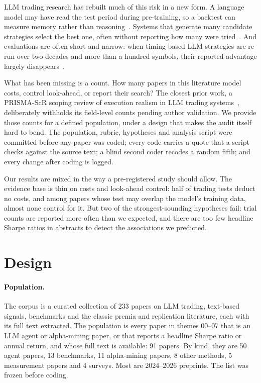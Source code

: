 \documentclass[11pt]{article}
\begin{document}
LLM trading research has rebuilt much of this risk in a new form. A language
model may have read the test period during pre-training, so a backtest can
measure memory rather than reasoning~\cite{li2025timetravel,li2025mirage,gao2026lookahead}.
Systems that generate many candidate strategies select the best one, often
without reporting how many were tried~\cite{gencay2026honest}. And evaluations
are often short and narrow: when timing-based LLM strategies are re-run over two
decades and more than a hundred symbols, their reported advantage largely
disappears~\cite{li2026finsaber}.

What has been missing is a count. How many papers in this literature model
costs, control look-ahead, or report their search? The closest prior work, a
PRISMA-ScR scoping review of execution realism in LLM trading
systems~\cite{yao2026execution}, deliberately withholds its field-level counts
pending author validation. We provide those counts for a defined population,
under a design that makes the audit itself hard to bend. The population,
rubric, hypotheses and analysis script were committed before any paper was
coded; every code carries a quote that a script checks against the source text;
a blind second coder recodes a random fifth; and every change after coding is
logged.

Our results are mixed in the way a pre-registered study should allow. The
evidence base is thin on costs and look-ahead control: half of trading tests
deduct no costs, and among papers whose test may overlap the model's training
data, almost none control for it. But two of the strongest-sounding hypotheses
fail: trial counts are reported more often than we expected, and there are too
few headline Sharpe ratios in abstracts to detect the associations we
predicted.

\section{Design}

\paragraph{Population.} The corpus is a curated collection of 233 papers on LLM
trading, text-based signals, benchmarks and the classic premia and
replication literature, each with its full text extracted. The population is
every paper in themes 00--07 that is an LLM agent or alpha-mining paper, or
that reports a headline Sharpe ratio or annual return, and whose full text is
available: 91 papers. By kind, they are 50 agent papers, 13 benchmarks, 11
alpha-mining papers, 8 other methods, 5 measurement papers and 4 surveys. Most
are 2024--2026 preprints. The list was frozen before coding.
\end{document}
